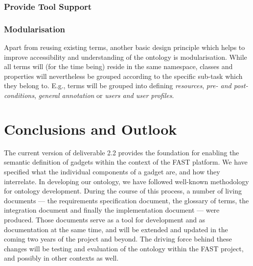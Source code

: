 \documentclass{fast_latex}
\begin{document}

\subsubsection{Provide Tool Support} %
\label{ssub:provide_tool_support}


\subsubsection{Modularisation} %
\label{ssub:modularisation}

Apart from reusing existing terms, another basic design principle which helps to improve accessibility and understanding of the ontology is modularisation. While all terms will (for the time being) reside in the same namespace, classes and properties will nevertheless be grouped according to the specific sub-task which they belong to. E.g., terms will be grouped into defining \emph{resources}, \emph{pre- and post-conditions}, \emph{general annotation} or \emph{users and user profiles}.



\section{Conclusions and Outlook} %
\label{sec:conclusions}

The current version of deliverable 2.2 provides the foundation for enabling the semantic definition of gadgets within the context of the FAST platform. We have specified what the individual components of a gadget are, and how they interrelate. In developing our ontology, we have followed  well-known methodology for ontology development. During the course of this process, a number of living documents --- the requirements specification document, the glossary of terms, the integration document and finally the implementation document --- were produced. Those documents serve as a tool for development and as documentation at the same time, and will be extended and updated in the coming two years of the project and beyond. The driving force behind these changes will be testing and evaluation of the ontology within the FAST project, and possibly in other contexts as well.
\end{document}
